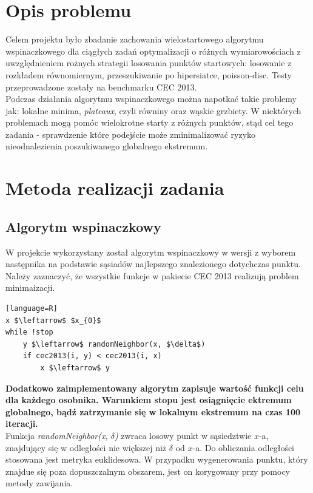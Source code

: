 \documentclass{article}
\begin{document}
\section{Opis problemu}

Celem projektu było zbadanie zachowania wielostartowego algorytmu wspinaczkowego dla ciągłych zadań optymalizacji o różnych wymiarowościach z uwzględnieniem rożnych strategii losowania punktów startowych: losowanie z rozkładem równomiernym, przeszukiwanie po hipersiatce, poisson-disc. Testy przeprowadzone zostały na benchmarku CEC 2013.\\

Podczas działania algorytmu wspinaczkowego można napotkać takie problemy jak: lokalne minima, \textit{plateaux}, czyli równiny oraz wąskie grzbiety. W niektórych problemach mogą pomóc wielokrotne starty z różnych punktów, stąd cel tego zadania - sprawdzenie które podejście może zminimalizować ryzyko nieodnalezienia poszukiwanego globalnego ekstremum.

\section{Metoda realizacji zadania}

\subsection{Algorytm wspinaczkowy}

W projekcie wykorzystany został algorytm wspinaczkowy w wersji z wyborem następnika na podstawie sąsiadów najlepszego znalezionego dotychczas punktu. \\
Należy zaznaczyć, że wszystkie funkcje w pakiecie CEC 2013 realizują problem minimaizacji.

\begin{lstlisting}[mathescape][language=R]
x $\leftarrow$ $x_{0}$
while !stop
	y $\leftarrow$ randomNeighbor(x, $\delta$)
	if cec2013(i, y) < cec2013(i, x)
		x $\leftarrow$ y
\end{lstlisting}


\textbf{Dodatkowo zaimplementowany algorytm zapisuje wartość funkcji celu dla każdego osobnika. Warunkiem stopu jest osiągnięcie ektremum globalnego, bądź zatrzymanie się w lokalnym ekstremum na czas 100 iteracji.}\\

Funkcja \textit{randomNeighbor(x, $\delta$)} zwraca losowy punkt w sąsiedztwie $x$-a, znajdujący się w odległości nie większej niż $\delta$ od $x$-a. Do obliczania odległości stosowana jest metryka euklidesowa. W przypadku wygenerowania punktu, który znajdue się poza dopuszczalnym obszarem, jest on korygowany przy pomocy metody zawijania.\\
\end{document}
